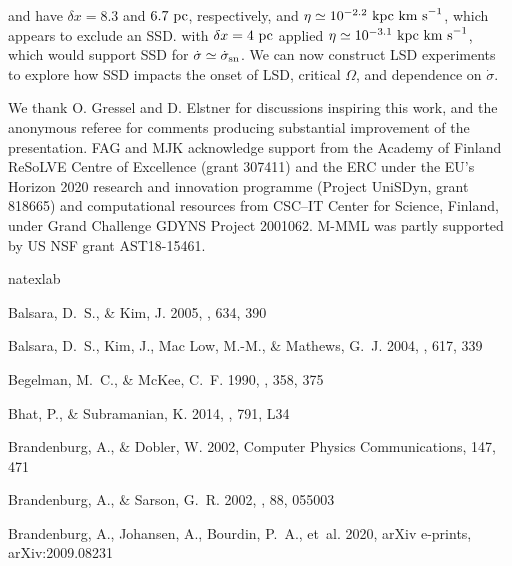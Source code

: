 \documentclass[preprint2]{aastex63}
\newcommand\SNr{\dot\sigma_{\rm sn}}
\newcommand\kpc{~ {\rm kpc}}
\newcommand\pc{~ {\rm pc}}
\newcommand\dx{ {\delta x}}
\newcommand\kms{~ {\rm km~ s}^{-1}}
\begin{document}
{ \citet{Gressel:2008} and \citet{GE20} have $\dx=8.3$ and $6.7\pc$,
 respectively, and $\eta\simeq10^{-2.2}\kpc\kms$, which appears to exclude
 an SSD.
 \citet{Gent:2013a} with $\dx=4\pc$ applied $\eta\simeq10^{-3.1}\kpc\kms$,
 which would support SSD for $\dot\sigma\simeq\SNr$.
 {We can now construct LSD experiments to explore how SSD impacts the 
onset of LSD, critical $\Omega$, and dependence on $\dot\sigma$.}   

\acknowledgments
 {We thank O. Gressel and D. Elstner for discussions inspiring this work,
 and the anonymous referee for comments producing substantial improvement of
 the presentation.}
 FAG and MJK acknowledge support from the Academy of Finland
 ReSoLVE Centre of Excellence (grant 307411) and the ERC
 under the EU's Horizon 2020 research and innovation
 programme (Project UniSDyn, grant 818665) and computational
 resources from CSC–IT Center for Science, Finland, under Grand
 Challenge GDYNS Project 2001062. 
 M-MML was partly supported by US NSF grant AST18-15461.



\begin{thebibliography}{}
\expandafter\ifx\csname natexlab\endcsname\relax\def\natexlab#1{#1}\fi
\providecommand{\url}[1]{\href{#1}{#1}}

{Balsara}, D.~S., \& {Kim}, J. 2005, \apj, 634, 390

{Balsara}, D.~S., {Kim}, J., {Mac Low}, M.-M., \& {Mathews}, G.~J. 2004, \apj,
 617, 339

{Begelman}, M.~C., \& {McKee}, C.~F. 1990, \apj, 358, 375

{Bhat}, P., \& {Subramanian}, K. 2014, \apjl, 791, L34

{Brandenburg}, A., \& {Dobler}, W. 2002, Computer Physics Communications, 147,
 471

{Brandenburg}, A., \& {Sarson}, G.~R. 2002, \prl, 88, 055003

{Brandenburg}, A., {Johansen}, A., {Bourdin}, P.~A., {et~al.} 2020, arXiv
 e-prints, arXiv:2009.08231


\end{thebibliography}}
\end{document}
